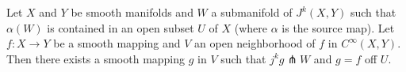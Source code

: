Let $X$ and $Y$ be smooth manifolds and $W$ a submanifold of $J^k(X, Y)$ such that $\alpha(W)$ is contained in an open subset $U$ of $X$ (where $\alpha$ is the source map). Let $f: X \to Y$ be a smooth mapping and $V$ an open neighborhood of $f$ in $C^\infty(X, Y)$. Then there exists a smooth mapping $g$ in $V$ such that $j^k g \pitchfork W$ and $g = f$ off $U$.